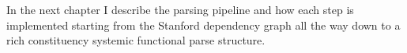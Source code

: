     In the next chapter I describe the parsing pipeline and how each step is implemented starting from the Stanford dependency graph all the way down to a rich constituency systemic functional parse structure.

    
    
    
    

